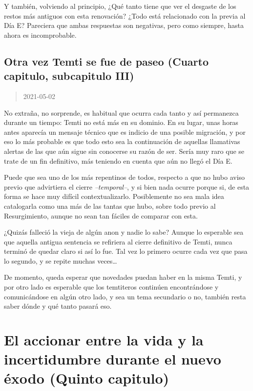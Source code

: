 \documentclass[
  spanish,
]{book}
\begin{document}
Y también, volviendo al principio, ¿Qué tanto tiene que ver el desgaste de los restos más antiguos con esta renovación? ¿Todo está relacionado con la previa al Día E?
Pareciera que ambas respuestas son negativas, pero como siempre, hasta ahora es incomprobable.

\hypertarget{otra-vez-temti-se-fue-de-paseo-cuarto-capitulo-subcapitulo-iii}{%
\section{Otra vez Temti se fue de paseo (Cuarto capitulo, subcapitulo III)}\label{otra-vez-temti-se-fue-de-paseo-cuarto-capitulo-subcapitulo-iii}}

\begin{quote}
2021-05-02
\end{quote}

No extraña, no sorprende, es habitual que ocurra cada tanto y así permanezca durante un tiempo: Temti no está más en su dominio. En su lugar, unas horas antes aparecía un mensaje técnico que es indicio de una posible migración, y por eso lo más probable es que todo esto sea la continuación de aquellas llamativas alertas de las que aún sigue sin conocerse su razón de ser. Sería muy raro que se trate de un fin definitivo, más teniendo en cuenta que aún no llegó el Día E.

Puede que sea uno de los más repentinos de todos, respecto a que no hubo aviso previo que advirtiera el cierre \emph{--temporal--}, y si bien nada ocurre porque si, de esta forma se hace muy difícil contextualizarlo. Posiblemente no sea mala idea catalogarla como una más de las tantas que hubo, sobre todo previo al Resurgimiento, aunque no sean tan fáciles de comparar con esta.

¿Quizás falleció la vieja de algún anon y nadie lo sabe? Aunque lo esperable sea que aquella antigua sentencia se refiriera al cierre definitivo de Temti, nunca terminó de quedar claro si así lo fue. Tal vez lo primero ocurre cada vez que pasa lo segundo, y se repite muchas veces\ldots{}

De momento, queda esperar que novedades puedan haber en la misma Temti, y por otro lado es esperable que los temtiteros continúen encontrándose y comunicándose en algún otro lado, y sea un tema secundario o no, también resta saber dónde y qué tanto pasará eso.

\hypertarget{el-accionar-entre-la-vida-y-la-incertidumbre-durante-el-nuevo-uxe9xodo-quinto-capitulo}{%
\chapter{El accionar entre la vida y la incertidumbre durante el nuevo éxodo (Quinto capitulo)}\label{el-accionar-entre-la-vida-y-la-incertidumbre-durante-el-nuevo-uxe9xodo-quinto-capitulo}}
\end{document}
